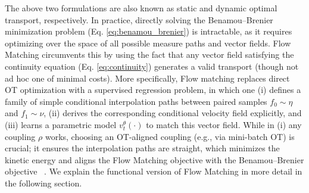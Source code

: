  The above two formulations are also known as static and dynamic optimal transport, respectively. In practice, directly solving the Benamou–Brenier minimization problem (Eq. \ref{eq:benamou_brenier}) is intractable, as it requires optimizing over the space of all possible measure paths and vector fields. Flow Matching circumvents this by using the fact that any vector field satisfying the continuity equation (Eq. \ref{eq:continuity}) generates a valid transport (though not ad hoc one of minimal costs).  More specifically, Flow matching replaces direct OT optimization with a supervised regression problem, in which one (i) defines a family of simple conditional interpolation paths between paired samples $f_0 \sim \eta$ and $f_1 \sim \nu$, 
%
(ii) derives the corresponding conditional velocity field explicitly, and 
%
(iii) learns a parametric model $v^\theta_t(\cdot)$ to match this vector field.
%
While in (i) any coupling $\rho$ works, choosing an OT-aligned coupling (e.g., via mini-batch OT) is crucial; it ensures the interpolation paths are straight, which minimizes the kinetic energy and aligns the Flow Matching objective with the Benamou–Brenier objective ~\citep{pooladian2023multisample, tong2023improving}. We explain the functional version of Flow Matching in more detail in the following section.
%

